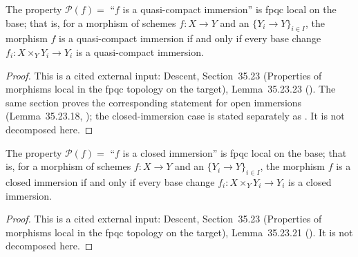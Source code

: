 \begin{lemma}
\label{lem:pc-qc-immersion-fpqc-local}
The property $\mathcal P(f)=$ ``$f$ is a quasi-compact immersion'' is fpqc local on the base; that
is, for a morphism of schemes $f:X\to Y$ and an
 $\{Y_i\to Y\}_{i\in I}$, the
morphism $f$ is a quasi-compact immersion if and only if every base change
$f_i:X\times_YY_i\to Y_i$ is a quasi-compact immersion.
\end{lemma}
\begin{proof}
This is a cited external input: Descent, Section~35.23 (Properties of morphisms local in the
fpqc topology on the target), Lemma~35.23.23 ().  The same section proves
the corresponding statement for open immersions (Lemma~35.23.18, ); the
closed-immersion case is stated separately as .  It
is not decomposed here.
\end{proof}

\begin{lemma}
\label{lem:pc-closed-immersion-fpqc-local}
The property $\mathcal P(f)=$ ``$f$ is a closed immersion'' is fpqc local on the base; that
is, for a morphism of schemes $f:X\to Y$ and an
 $\{Y_i\to Y\}_{i\in I}$, the morphism $f$ is
a closed immersion if and only if every base change $f_i:X\times_YY_i\to Y_i$ is a closed
immersion.
\end{lemma}
\begin{proof}
This is a cited external input: Descent, Section~35.23 (Properties of morphisms local in the
fpqc topology on the target), Lemma~35.23.21 ().  It is not decomposed
here.
\end{proof}

